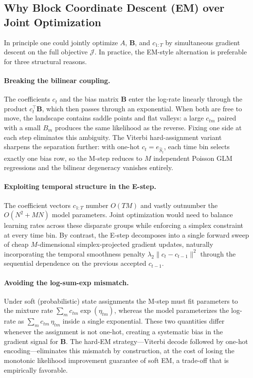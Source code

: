 \documentclass[11pt]{article}
\begin{document}
\subsection{Why Block Coordinate Descent (EM) over Joint Optimization}

In principle one could jointly optimize \(A\), \(\mathbf{B}\), and
\(c_{1:T}\) by simultaneous gradient descent on the full objective
\(\mathcal{J}\).  In practice, the EM-style alternation is preferable
for three structural reasons.

\paragraph{Breaking the bilinear coupling.}
The coefficients \(c_t\) and the bias matrix \(\mathbf{B}\) enter the
log-rate linearly through the product \(c_t^\top\mathbf{B}\), which
then passes through an exponential.  When both are free to move, the
landscape contains saddle points and flat valleys: a large \(c_{tm}\)
paired with a small \(B_m\) produces the same likelihood as the
reverse.  Fixing one side at each step eliminates this ambiguity.  The
Viterbi hard-assignment variant sharpens the separation further:
with one-hot \(c_t = e_{\hat{S}_t}\), each time bin selects exactly one
bias row, so the M-step reduces to \(M\) independent Poisson GLM
regressions and the bilinear degeneracy vanishes entirely.

\paragraph{Exploiting temporal structure in the E-step.}
The coefficient vectors \(c_{1:T}\) number \(O(TM)\) and vastly
outnumber the \(O(N^2+MN)\) model parameters.  Joint optimization
would need to balance learning rates across these disparate groups
while enforcing a simplex constraint at every time bin.  By contrast,
the E-step decomposes into a single forward sweep of cheap
\(M\)-dimensional simplex-projected gradient updates, naturally
incorporating the temporal smoothness penalty
\(\lambda_2\|c_t-c_{t-1}\|^2\) through the sequential dependence on the
previous accepted \(c_{t-1}\).

\paragraph{Avoiding the log-sum-exp mismatch.}
Under soft (probabilistic) state assignments the M-step must fit
parameters to the mixture rate
\(\sum_m c_{tm}\exp(\eta_{tm})\), whereas the model parameterizes the
log-rate as \(\sum_m c_{tm}\,\eta_{tm}\) inside a single exponential.
These two quantities differ whenever the assignment is not one-hot,
creating a systematic bias in the gradient signal for \(\mathbf{B}\).
The hard-EM strategy—Viterbi decode followed by one-hot
encoding—eliminates this mismatch by construction, at the cost of
losing the monotonic likelihood improvement guarantee of soft EM, a
trade-off that is empirically favorable.
\end{document}
